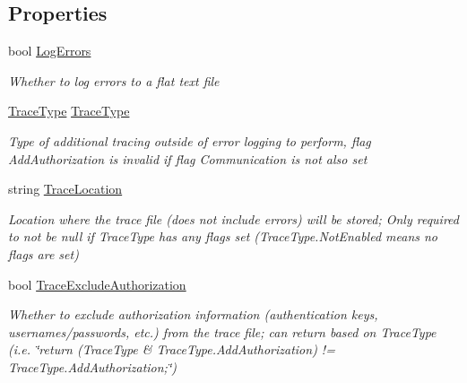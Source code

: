 \subsection*{Properties}
\begin{DoxyCompactItemize}
\item 
bool \hyperlink{interface_cloud_api_public_1_1_interfaces_1_1_i_add_trace_settings_a408aee5af8022c8d372501af301459a6}{Log\-Errors}
\begin{DoxyCompactList}\small\item\em Whether to log errors to a flat text file \end{DoxyCompactList}\item 
\hyperlink{namespace_cloud_api_public_1_1_static_a7e5ae8f2a85f427de3d6c8a5afcbb029}{Trace\-Type} \hyperlink{interface_cloud_api_public_1_1_interfaces_1_1_i_add_trace_settings_ac48528e64d5cf0ffce04bc93463d138e}{Trace\-Type}
\begin{DoxyCompactList}\small\item\em Type of additional tracing outside of error logging to perform, flag Add\-Authorization is invalid if flag Communication is not also set \end{DoxyCompactList}\item 
string \hyperlink{interface_cloud_api_public_1_1_interfaces_1_1_i_add_trace_settings_a5a3de8f9ca58461e90bdaa48538596e3}{Trace\-Location}
\begin{DoxyCompactList}\small\item\em Location where the trace file (does not include errors) will be stored; Only required to not be null if Trace\-Type has any flags set (Trace\-Type.\-Not\-Enabled means no flags are set) \end{DoxyCompactList}\item 
bool \hyperlink{interface_cloud_api_public_1_1_interfaces_1_1_i_add_trace_settings_a29cd00532a90fca920517cfb163b0a42}{Trace\-Exclude\-Authorization}
\begin{DoxyCompactList}\small\item\em Whether to exclude authorization information (authentication keys, usernames/passwords, etc.) from the trace file; can return based on Trace\-Type (i.\-e. \char`\"{}return (\-Trace\-Type \& Trace\-Type.\-Add\-Authorization) != Trace\-Type.\-Add\-Authorization;\char`\"{}) \end{DoxyCompactList}\item 

\end{DoxyCompactItemize}

